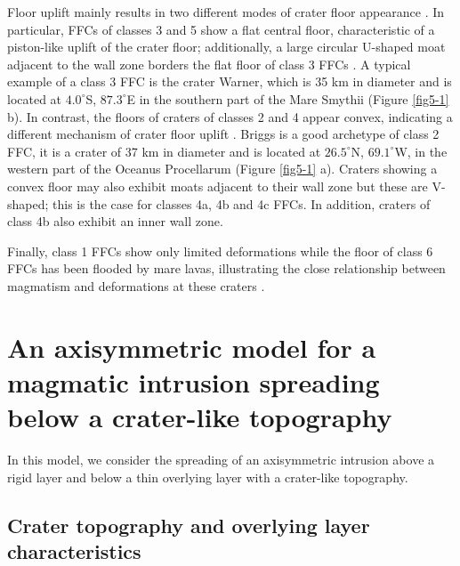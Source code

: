 \begin{article}
  Floor uplift mainly  results in two different modes  of crater floor
  appearance \citep{Schultz1976}. In particular, FFCs of classes 3 and
  5 show a flat central  floor, characteristic of a piston-like uplift
  of the  crater floor; additionally,  a large circular  U-shaped moat
  adjacent to  the wall zone  borders the flat  floor of class  3 FFCs
  \citep{Schultz1976,Jozwiak2012}. A typical example  of a class 3 FFC
  is the crater Warner,  which is 35 km in diameter  and is located at
  $4.0^{\circ}$S,  $87.3^{\circ}$E in  the southern  part of  the Mare
  Smythii (Figure \ref{fig5-1} b). In  contrast, the floors of craters
  of classes 2  and 4 appear convex, indicating  a different mechanism
  of crater floor uplift  \citep{Schultz1976,Jozwiak2012}. Briggs is a
  good archetype of class  2 FFC, it is a crater of  37 km in diameter
  and is  located at $26.5^{\circ}$N, $69.1^{\circ}$W,  in the western
  part  of the  Oceanus Procellarum  (Figure \ref{fig5-1}  a). Craters
  showing a convex floor may also exhibit moats adjacent to their wall
  zone but these are V-shaped; this is the case for classes 4a, 4b and
  4c FFCs. In addition, craters of class 4b also exhibit an inner wall
  zone.
	
  Finally, class 1 FFCs show only limited deformations while the floor
  of class  6 FFCs has  been flooded  by mare lavas,  illustrating the
  close  relationship  between  magmatism and  deformations  at  these
  craters \citep{Schultz1976,Jozwiak2012}.

  \section{An axisymmetric  model for  a magmatic  intrusion spreading
    below a crater-like topography}

  In  this  model,  we  consider  the  spreading  of  an  axisymmetric
  intrusion above a rigid layer and  below a thin overlying layer with
  a crater-like topography.
	
  \subsection{Crater topography and overlying layer characteristics}
  \label{Crater_Topography}
	

\end{article}
